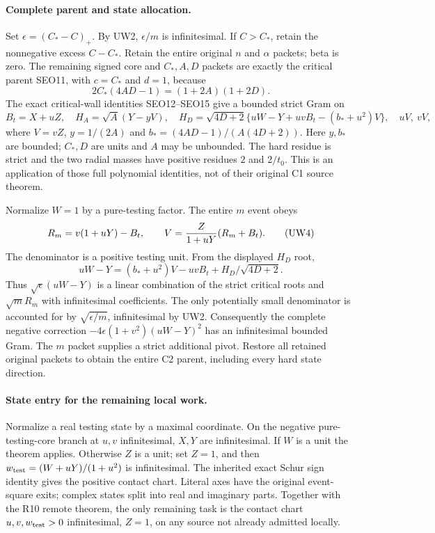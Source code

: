 \paragraph{Complete parent and state allocation.}
Set $\epsilon=(C_*-C)_+$. By UW2, $\epsilon/m$ is
infinitesimal. If $C>C_*$, retain the nonnegative excess $C-C_*$.
Retain the entire original $n$ and $\alpha$ packets; beta is zero.
The remaining signed core and $C_*,A,D$ packets are exactly the
critical parent SEO11, with $c=C_*$ and $d=1$, because
\[
                  2C_*(4AD-1)=(1+2A)(1+2D).
\]
The exact critical-wall identities SEO12--SEO15 give a bounded strict
Gram on
\[
 B_t=X+uZ,\quad H_A=\sqrt A(Y-yV),\quad
 H_D=\sqrt{4D+2}\{uW-Y+uvB_t-(b_*+u^2)V\},
 \quad uV,\ vV,
\]
where $V=vZ$, $y=1/(2A)$ and
$b_*=(4AD-1)/(A(4D+2))$. Here $y,b_*$ are bounded;
$C_*,D$ are units and $A$ may be unbounded. The hard residue is
strict and the two radial masses have positive residues $2$ and
$2/t_0$. This is an application of those full polynomial identities,
not of their original C1 source theorem.

Normalize $W=1$ by a pure-testing factor. The entire $m$ event obeys
\[
 R_m=v(1+uY)-B_t,\qquad
 V={Z\over1+uY}(R_m+B_t).                         \tag{UW4}
\]
The denominator is a positive testing unit. From the displayed
$H_D$ root,
\[
 uW-Y=(b_*+u^2)V-uvB_t+H_D/\sqrt{4D+2}.
\]
Thus $\sqrt\epsilon(uW-Y)$ is a linear combination of the strict
critical roots and $\sqrt mR_m$ with infinitesimal coefficients.
The only potentially small denominator is accounted for by
$\sqrt{\epsilon/m}$, infinitesimal by UW2. Consequently the complete
negative correction $-4\epsilon(1+v^2)(uW-Y)^2$ has an
infinitesimal bounded Gram. The $m$ packet supplies a strict additional
pivot. Restore all retained original packets to obtain the entire
C2 parent, including every hard state direction.

\paragraph{State entry for the remaining local work.}
Normalize a real testing state by a maximal coordinate. On the
negative pure-testing-core branch at $u,v$ infinitesimal, $X,Y$
are infinitesimal. If $W$ is a unit the theorem applies. Otherwise
$Z$ is a unit; set $Z=1$, and then
$w_{\rm test}=(W+uY)/(1+u^2)$ is infinitesimal. The inherited exact
Schur sign identity gives the positive contact chart. Literal axes
have the original event-square exits; complex states split into real
and imaginary parts. Together with the R10 remote theorem, the only
remaining task is the contact chart $u,v,w_{\rm test}>0$
infinitesimal, $Z=1$, on any source not already admitted locally.


